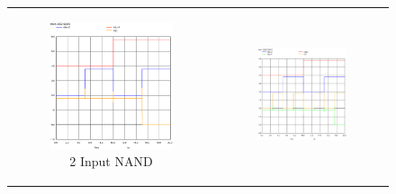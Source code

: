 \documentclass[conference]{IEEEtran}
\begin{document}
\begin{figure}[H]
    \centering
    \begin{tabular}{cc}
        \begin{subfigure}{0.44\linewidth}
            \centering
            \includegraphics[width=\textwidth]{images/nand_cmos_post_tran.eps}
            \caption{2 Input NAND}
        \end{subfigure} &
        \begin{subfigure}{0.44\linewidth}
            \centering
            \includegraphics[width=\textwidth]{images/nand_3_cmos_post_tran.eps}

\end{subfigure}
\end{tabular}
\end{figure}
\end{document}
